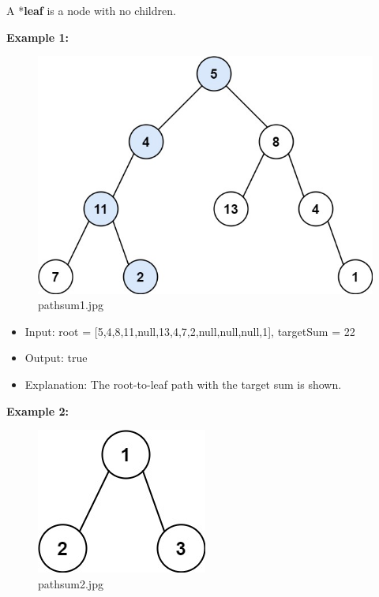 \documentclass[11pt]{article}
\providecommand{\tightlist}{%
      \setlength{\itemsep}{0pt}\setlength{\parskip}{0pt}}
\begin{document}
A *\textbf{leaf} is a node with no children.

\textbf{Example 1:}

\begin{figure}
\centering
\includegraphics{ee18dc1e-61f4-4b2b-8045-58f649d8d464.jpg}
\caption{pathsum1.jpg}
\end{figure}

\begin{itemize}
\tightlist
\item
  Input: root = {[}5,4,8,11,null,13,4,7,2,null,null,null,1{]}, targetSum
  = 22
\item
  Output: true
\item
  Explanation: The root-to-leaf path with the target sum is shown.
\end{itemize}

\textbf{Example 2:}

\begin{figure}
\centering
\includegraphics{14094bf8-292d-4f6a-ad02-aa79df01c609.jpg}
\caption{pathsum2.jpg}
\end{figure}
\end{document}
